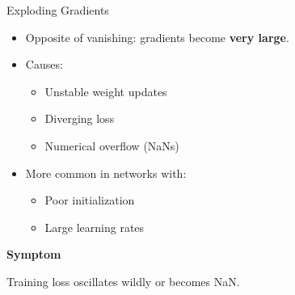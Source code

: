 \documentclass[aspectratio=169]{beamer}
\begin{document}
%
%
\begin{frame}{Exploding Gradients}

\begin{itemize}
    \item Opposite of vanishing: gradients become \textbf{very large}.
    \item Causes:
    \begin{itemize}
        \item Unstable weight updates
        \item Diverging loss
        \item Numerical overflow (NaNs)
    \end{itemize}
    \item More common in networks with:
    \begin{itemize}
        \item Poor initialization
        \item Large learning rates
    \end{itemize}
\end{itemize}

\vspace{0.3cm}
\textbf{Symptom}
\begin{block}{}
Training loss oscillates wildly or becomes NaN.
\end{block}

\end{frame}
%
%
\end{document}

